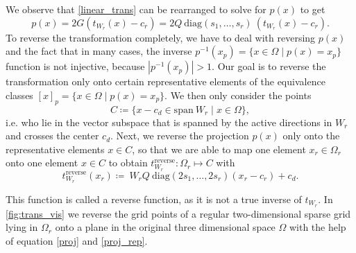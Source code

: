 \documentclass[
  a4paper,  %
  twoside,  %
  bibliography=totoc,
  headsepline,
  cleardoublepage=empty,
  parskip=half,
  draft=false
]{scrbook}
\begin{document}
We observe that \cref{linear_trans} can be rearranged to solve for $p(x)$ to get
\begin{equation}
p(x)=2 G (t_{W_r}(x) - c_r)=2 Q ~ \text{diag}(s_1, \dots, s_r) ~ (t_{W_r}(x) - c_r).
\label{proj}
\end{equation}
To reverse the transformation completely, we have to deal with reversing $p(x)$ and the fact that in many cases, the inverse $p^{-1}(x_p)=\{x \in \Omega \mid p(x)=x_{p}\}$ function is not injective, because $|p^{-1}(x_p)| > 1$.
Our goal is to reverse the transformation only onto certain representative elements of the equivalence classes $[x]_p=\{x \in \Omega \mid p(x)=x_{p}\}$.
We then only consider the points
\begin{equation}
C \coloneqq \{x - c_d  \in \text{span} ~ W_r \mid x \in \Omega\},
\label{proj_rep}
\end{equation}
i.e. who lie in the vector subspace that is spanned by the active directions in $W_r$ and crosses the center $c_d$.
Next, we reverse the projection $p(x)$ only onto the representative elements $x \in C$, so that we are able to map one element $x_r\in \Omega_r$ onto one element $x \in C$ to obtain $t_{W_r}^{\text{reverse}}\colon \Omega_r \mapsto C$ with
\begin{equation}
t_{W_r}^{\text{reverse}}(x_r) \coloneqq ~W_r Q ~ \text{diag}\left(2s_1, \dots, 2s_r\right) (x_r - c_r) + c_d.
\end{equation}

This function is called a reverse function, as it is not a true inverse of $t_{W_r}$.
In \cref{fig:trans_vis} we reverse the grid points of a regular two-dimensional sparse grid lying in $\Omega_r$ onto a plane in the original three dimensional space $\Omega$ with the help of equation \cref{proj} and \cref{proj_rep}.
\end{document}

